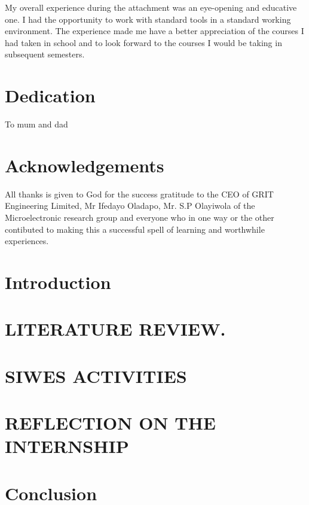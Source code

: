 \documentclass[12pt]{report}
\begin{document}
My overall experience during the attachment was an eye-opening and educative one. I
had the opportunity to work with standard tools in a standard working environment.
The experience made me have a better appreciation of the courses I had taken in
school and to look forward to the courses I would be taking in subsequent semesters.
 
\chapter*{Dedication}
To mum and dad


 
\chapter*{Acknowledgements}
All thanks is given to God for the success gratitude to the CEO of GRIT Engineering Limited, Mr Ifedayo Oladapo, Mr. S.P Olayiwola of the Microelectronic research group and everyone who in one way or the other contibuted to making this a successful spell of learning and worthwhile experiences.

 
\tableofcontents


\listoffigures

\chapter{Introduction}

 
\chapter{LITERATURE REVIEW.}

 
\chapter{SIWES ACTIVITIES}

 
\chapter{REFLECTION ON THE INTERNSHIP}

 
\chapter{Conclusion}

%
%
%

\end{document}
